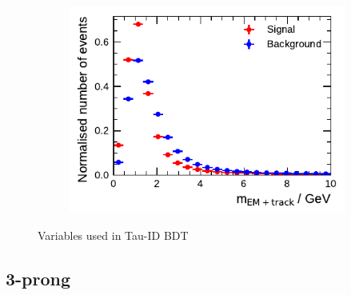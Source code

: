 \begin{figure}[!ht]
\begin{subfigure}{0.5\textwidth}
    \includegraphics{./figures/baseline_bdt_vars/1p/mEflowApprox.pdf}
  \end{subfigure}
  \caption[]{Variables used in Tau-ID BDT}
\end{figure}

\clearpage
\subsection{3-prong}

